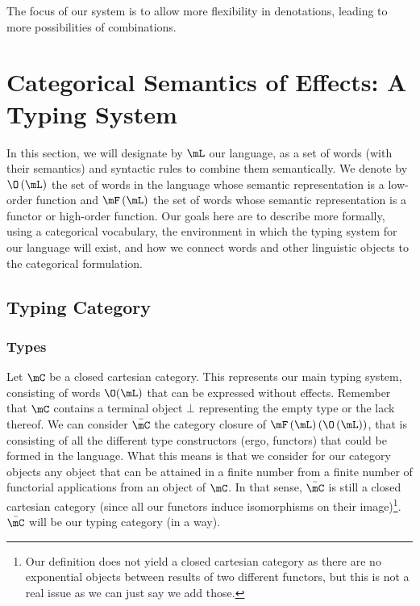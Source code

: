 \documentclass[math, english, info]{cours}
\begin{document}
The focus of our system is to allow more flexibility in denotations, leading to more
possibilities of combinations.

\section{Categorical Semantics of Effects: A Typing System}
\label{sec:typingsystem}
In this section, we will designate by $\mL$ our language, as a set of words (with their semantics) and syntactic rules to combine them semantically.
We denote by $\O\left( \mL \right)$ the set of words in the language whose semantic representation is a low-order function and $\mF\left( \mL \right)$ the set of words whose semantic representation is a functor or high-order function.
Our goals here are to describe more formally, using a categorical vocabulary, the environment in which the typing system for our language will exist, and how we connect words and other linguistic objects to the categorical formulation.

\subsection{Typing Category}\label{subsec:typingcategory}
\subsubsection{Types}\label{subsubsec:types}
Let $\mC$ be a closed cartesian category. This represents our main typing system, consisting of words $\O(\mL)$ that can be expressed without effects.
Remember that $\mC$ contains a terminal object $\bot$ representing the empty type or the lack thereof.
We can consider $\bar{\mC}$ the category closure of $\mF\left( \mL \right)\left(\O\left( \mL \right)\right)$, that is consisting of all the different type constructors (ergo, functors) that could be formed in the language.
What this means is that we consider for our category objects any object that can be attained in a finite number from a finite number of functorial applications from an object of $\mC$.
In that sense, $\bar{\mC}$ is still a closed cartesian category (since all our functors induce isomorphisms on their image)\footnote{Our definition does not yield a closed cartesian category as there are no exponential objects between results of two different functors, but this is not a real issue as we can just say we add those.}.
$\bar{\mC}$ will be our typing category (in a way).
\end{document}
